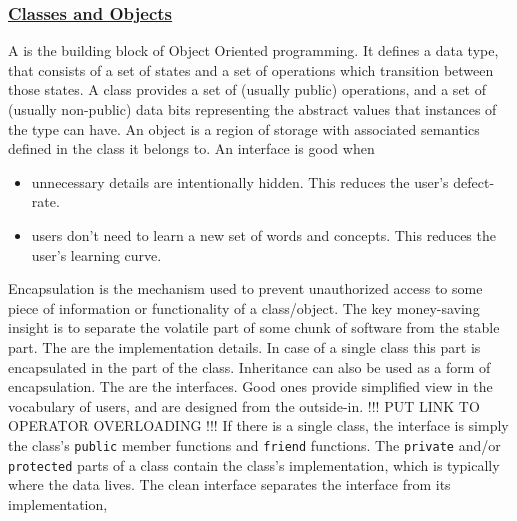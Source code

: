 \subsubsection{\href{https://isocpp.org/wiki/faq/classes-and-objects}{\textbf{Classes and Objects}}}
A  is the building block of Object Oriented programming. 
It defines a data type, that consists of a set of states and a set of 
operations which transition between those states. A class provides a set 
of (usually public) operations, and a set of (usually non-public) data 
bits representing the abstract values that instances of the type can have.
\newline
An object is a region of storage with associated semantics defined in the 
class it belongs to.
\newline
An interface is good when
\begin{itemize}
    \item unnecessary details are intentionally hidden. 
          \newline
          This reduces the user’s defect-rate.
    \item users don’t need to learn a new set of words and concepts. 
          \newline
          This reduces the user’s learning curve.
\end{itemize}
Encapsulation is the mechanism used to prevent unauthorized access to 
some piece of information or functionality of a class/object.
\newline
The key money-saving insight is to separate the volatile part of some 
chunk of software from the stable part.
\newline
The  are the implementation details. In case 
of a single class this part is encapsulated in the  
part of the class. Inheritance can also be used as a form of encapsulation.
\newline
The  are the interfaces. Good ones provide 
simplified view in the vocabulary of users, and are designed from the 
outside-in. !!! PUT LINK TO OPERATOR OVERLOADING !!! 
\newline
If there is a single class, the interface is simply the class's \texttt{public} 
member functions and \texttt{friend} functions. The \texttt{private} 
and/or \texttt{protected} parts of a class contain the class’s implementation, 
which is typically where the data lives.
\newline
The clean interface separates the interface from its implementation, 
